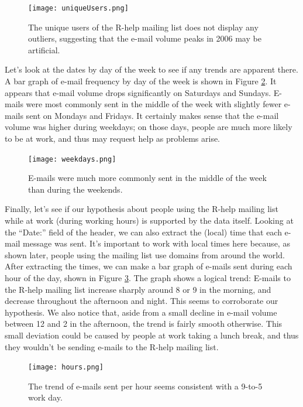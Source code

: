 \documentclass[12pt, a4paper, oneside]{amsart}
\begin{document}
\begin{figure}[htp]
\centering
\texttt{[image: uniqueUsers.png]}
\caption{The unique users of the R-help mailing list does not display any outliers, suggesting that the e-mail volume peaks in 2006 may be artificial.}\label{fig:uniqueUsers}
\end{figure}

Let's look at the dates by day of the week to see if any trends are apparent there.  A bar graph of e-mail frequency by day of the week is shown in Figure \ref{fig:weekdays}.  It appears that e-mail volume drops significantly on Saturdays and Sundays.  E-mails were most commonly sent in the middle of the week with slightly fewer e-mails sent on Mondays and Fridays.  It certainly makes sense that the e-mail volume was higher during weekdays; on those days, people are much more likely to be at work, and thus may request help as problems arise.

\begin{figure}[htp]
\centering
\texttt{[image: weekdays.png]}
\caption{E-mails were much more commonly sent in the middle of the week than during the weekends.}\label{fig:weekdays}
\end{figure}

Finally, let's see if our hypothesis about people using the R-help mailing list while at work (during working hours) is supported by the data itself.  Looking at the ``Date:'' field of the header, we can also extract the (local) time that each e-mail message was sent.  It's important to work with local times here because, as shown later, people using the mailing list use domains from around the world.  After extracting the times, we can make a bar graph of e-mails sent during each hour of the day, shown in Figure \ref{fig:hours}.  The graph shows a logical trend: E-mails to the R-help mailing list increase sharply around 8 or 9 in the morning, and decrease throughout the afternoon and night.  This seems to corroborate our hypothesis.  We also notice that, aside from a small decline in e-mail volume between 12 and 2 in the afternoon, the trend is fairly smooth otherwise.  This small deviation could be caused by people at work taking a lunch break, and thus they wouldn't be sending e-mails to the R-help mailing list.

\begin{figure}[htp]
\centering
\texttt{[image: hours.png]}
\caption{The trend of e-mails sent per hour seems consistent with a 9-to-5 work day.}\label{fig:hours}
\end{figure}
\end{document}
